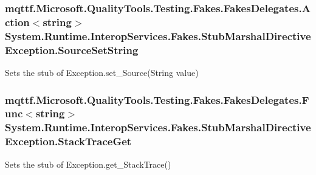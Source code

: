 \hypertarget{class_system_1_1_runtime_1_1_interop_services_1_1_fakes_1_1_stub_marshal_directive_exception_a36c8e54c6e4e496618431b4deeb65bce}{
\subsubsection[{Source\-Set\-String}]{\setlength{\rightskip}{0pt plus 5cm}mqttf.\-Microsoft.\-Quality\-Tools.\-Testing.\-Fakes.\-Fakes\-Delegates.\-Action$<$string$>$ System.\-Runtime.\-Interop\-Services.\-Fakes.\-Stub\-Marshal\-Directive\-Exception.\-Source\-Set\-String}}\label{class_system_1_1_runtime_1_1_interop_services_1_1_fakes_1_1_stub_marshal_directive_exception_a36c8e54c6e4e496618431b4deeb65bce}


Sets the stub of Exception.\-set\-\_\-\-Source(\-String value)

\hypertarget{class_system_1_1_runtime_1_1_interop_services_1_1_fakes_1_1_stub_marshal_directive_exception_adfca52737251a5a75bf642edc0c62f17}{
\subsubsection[{Stack\-Trace\-Get}]{\setlength{\rightskip}{0pt plus 5cm}mqttf.\-Microsoft.\-Quality\-Tools.\-Testing.\-Fakes.\-Fakes\-Delegates.\-Func$<$string$>$ System.\-Runtime.\-Interop\-Services.\-Fakes.\-Stub\-Marshal\-Directive\-Exception.\-Stack\-Trace\-Get}}\label{class_system_1_1_runtime_1_1_interop_services_1_1_fakes_1_1_stub_marshal_directive_exception_adfca52737251a5a75bf642edc0c62f17}


Sets the stub of Exception.\-get\-\_\-\-Stack\-Trace()

